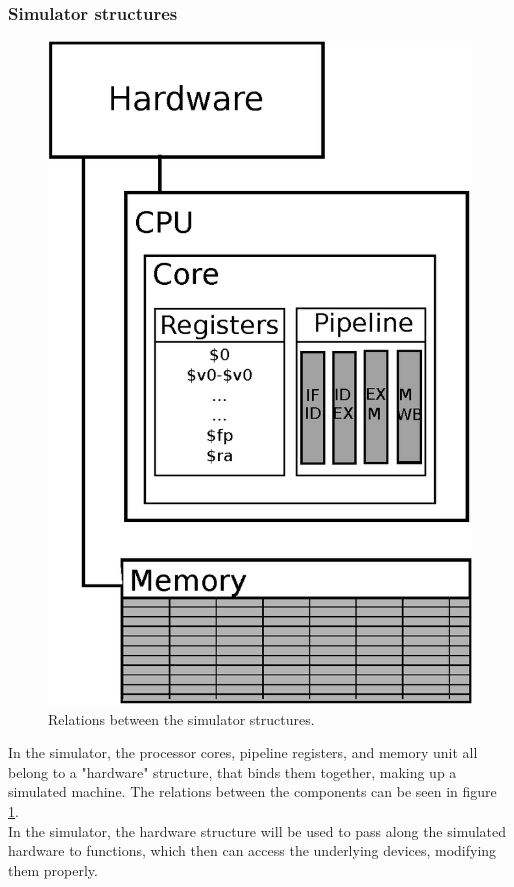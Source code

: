 \subsubsection{Simulator structures}
\begin{figure}[H]
	\centering
	\includegraphics[scale=0.55]{pipeline/structure_layout.eps}
	\caption{Relations between the simulator structures.}
	\label{fig:structure_layout}
\end{figure}
In the simulator, the processor cores, pipeline registers, and memory unit all
belong to a "hardware" structure, that binds them together, making up a
simulated machine. The relations between the components can be seen in figure
\ref{fig:structure_layout}.\\
In the simulator, the hardware structure will be used to pass along the
simulated hardware to functions, which then can access the underlying devices,
modifying them properly.


